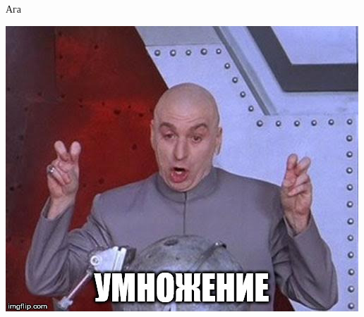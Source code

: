 \documentclass[utf8,xcolor=table]{beamer}
\begin{document}
\begin{frame}[t]{Ага}
	\begin{center}
		\includegraphics[width=0.5\linewidth]{multiplication-meme.jpg}
	\end{center}
\end{frame}
\end{document}

